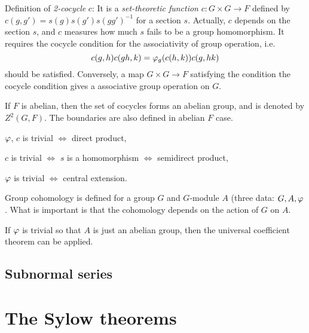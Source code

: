 \documentclass{../note}
\begin{document}
Definition of \emph{2-cocycle} $c$:
It is a \emph{set-theoretic function} $c:G\times G\to F$ defined by $c(g,g')=s(g)s(g')s(gg')^{-1}$ for a section $s$.
Actually, $c$ depends on the section $s$, and $c$ measures how much $s$ fails to be a group homomorphism.
It requires the cocycle condition for the associativity of group operation, i.e.
\[c(g,h)c(gh,k)=\varphi_g(c(h,k))c(g,hk)\]
should be satisfied.
Conversely, a map $G\times G\to F$ satisfying the condition the cocycle condition gives a associative group operation on $G$.

If $F$ is abelian, then the set of cocycles forms an abelian group, and is denoted by $Z^2(G,F)$.
The boundaries are also defined in abelian $F$ case.


\begin{parts}
\item $\varphi$, $c$ is trivial $\iff$ direct product,
\item $c$ is trivial $\iff$ $s$ is a homomorphism $\iff$ semidirect product,
\item $\varphi$ is trivial $\iff$ central extension.
\end{parts}

Group cohomology is defined for a group $G$ and $G$-module $A$ (three data: $G,A,\varphi$.
What is important is that the cohomology depends on the action of $G$ on $A$.

If $\varphi$ is trivial so that $A$ is just an abelian group, then the universal coefficient theorem can be applied.




\section{Subnormal series}










\chapter{The Sylow theorems}
\end{document}
